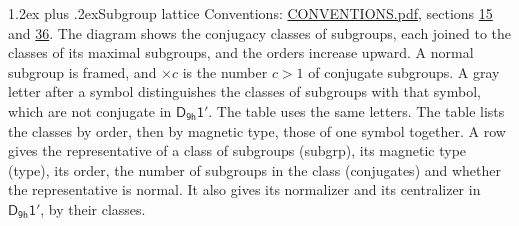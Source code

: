 \documentclass[10pt,a4paper]{article}
\makeatletter
\renewcommand\section{\@startsection{section}{1}{\z@}{-3ex plus -1ex minus -.2ex}%
  {1.2ex plus .2ex}{\normalfont\large\sffamily\bfseries\color{parttitle}}}
\numberwithin{equation}{section}
\newcommand{\grp}[1]{\mathsf{#1}}
\makeatother
\begin{document}
\section{Subgroup lattice}\label{s:subgroups}
Conventions: \href{../../CONVENTIONS.pdf}{CONVENTIONS.pdf}, sections \href{../../../rotation/CONVENTIONS.pdf\#conv.15}{15} and \href{../../CONVENTIONS.pdf\#conv.36}{36}.
The diagram shows the conjugacy classes of subgroups, each joined to the classes of its maximal subgroups, and the orders increase upward. \label{n:index.conjugates.c}\label{n:mark.conjugates}A normal subgroup is framed, and ${\times}c$ is the number $c > 1$ of conjugate subgroups. \label{n:mark.letter}A gray letter after a symbol distinguishes the classes of subgroups with that symbol, which are not conjugate in $\grp{D_{9h}1'}$. The table uses the same letters. The table lists the classes by order, then by magnetic type, those of one symbol together. \label{n:head.subgroup}\label{n:head.magnetic.type}\label{n:head.order}\label{n:head.conjugates}\label{n:head.normal}A row gives the representative of a class of subgroups (subgrp), its magnetic type (type), its order, the number of subgroups in the class (conjugates) and whether the representative is normal. \label{n:head.normalizer}\label{n:head.centralizer}It also gives its normalizer and its centralizer in $\grp{D_{9h}1'}$, by their classes. 
\end{document}
